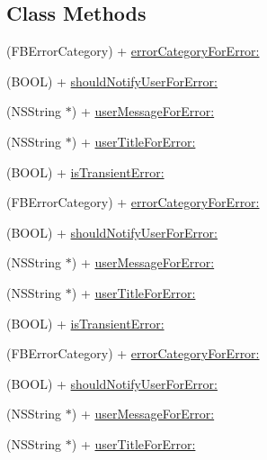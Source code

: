 \subsection*{Class Methods}
\begin{DoxyCompactItemize}
\item 
(F\+B\+Error\+Category) + \hyperlink{interfaceFBErrorUtility_a708ac3cac2c06d5f9432a45e4ad67082}{error\+Category\+For\+Error\+:}
\item 
(B\+O\+OL) + \hyperlink{interfaceFBErrorUtility_a1417132074a898433aa3a79ab6ebc7b6}{should\+Notify\+User\+For\+Error\+:}
\item 
(N\+S\+String $\ast$) + \hyperlink{interfaceFBErrorUtility_a059cc6fc35dd8fd3a13ee584ca7bb391}{user\+Message\+For\+Error\+:}
\item 
(N\+S\+String $\ast$) + \hyperlink{interfaceFBErrorUtility_a6b294817d5d939cfa12975d994d1dd8b}{user\+Title\+For\+Error\+:}
\item 
(B\+O\+OL) + \hyperlink{interfaceFBErrorUtility_a0bab53fff61ccb645f5647e1a03287c3}{is\+Transient\+Error\+:}
\item 
(F\+B\+Error\+Category) + \hyperlink{interfaceFBErrorUtility_a708ac3cac2c06d5f9432a45e4ad67082}{error\+Category\+For\+Error\+:}
\item 
(B\+O\+OL) + \hyperlink{interfaceFBErrorUtility_a1417132074a898433aa3a79ab6ebc7b6}{should\+Notify\+User\+For\+Error\+:}
\item 
(N\+S\+String $\ast$) + \hyperlink{interfaceFBErrorUtility_a059cc6fc35dd8fd3a13ee584ca7bb391}{user\+Message\+For\+Error\+:}
\item 
(N\+S\+String $\ast$) + \hyperlink{interfaceFBErrorUtility_a6b294817d5d939cfa12975d994d1dd8b}{user\+Title\+For\+Error\+:}
\item 
(B\+O\+OL) + \hyperlink{interfaceFBErrorUtility_a0bab53fff61ccb645f5647e1a03287c3}{is\+Transient\+Error\+:}
\item 
(F\+B\+Error\+Category) + \hyperlink{interfaceFBErrorUtility_a708ac3cac2c06d5f9432a45e4ad67082}{error\+Category\+For\+Error\+:}
\item 
(B\+O\+OL) + \hyperlink{interfaceFBErrorUtility_a1417132074a898433aa3a79ab6ebc7b6}{should\+Notify\+User\+For\+Error\+:}
\item 
(N\+S\+String $\ast$) + \hyperlink{interfaceFBErrorUtility_a059cc6fc35dd8fd3a13ee584ca7bb391}{user\+Message\+For\+Error\+:}
\item 
(N\+S\+String $\ast$) + \hyperlink{interfaceFBErrorUtility_a6b294817d5d939cfa12975d994d1dd8b}{user\+Title\+For\+Error\+:}

\end{DoxyCompactItemize}
